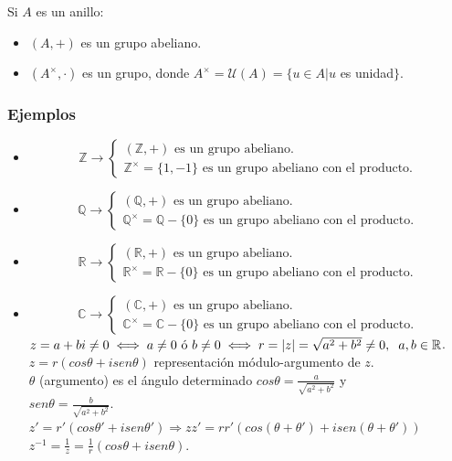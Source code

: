 \documentclass[11pt,a4paper]{article}
\begin{document}
Si $A$ es un anillo:
\begin{itemize}
\item $(A,+)$ es un grupo abeliano.
\item $(A^{\times},\cdot)$ es un grupo, donde $A^{\times} = \mathcal{U}(A) = \{u \in A | u$ es unidad$\}$.
\end{itemize}

\subsubsection*{Ejemplos}

\begin{itemize}
\item 
\begin{equation*}
\mathbb{Z} \to
\begin{cases}
(\mathbb{Z}, +) \text{ es un grupo abeliano.} \\
\mathbb{Z}^{\times} = \{1,-1\} \text{ es un grupo abeliano con el producto.}
\end{cases}
\end{equation*}
\item 
\begin{equation*}
\mathbb{Q} \to
\begin{cases}
(\mathbb{Q}, +) \text{ es un grupo abeliano.} \\
\mathbb{Q}^{\times} = \mathbb{Q}-\{0\} \text{ es un grupo abeliano con el producto.}
\end{cases}
\end{equation*}
\item 
\begin{equation*}
\mathbb{R} \to
\begin{cases}
(\mathbb{R}, +) \text{ es un grupo abeliano.} \\
\mathbb{R}^{\times} = \mathbb{R}-\{0\} \text{ es un grupo abeliano con el producto.}
\end{cases}
\end{equation*}
\item 
\begin{equation*}
\mathbb{C} \to
\begin{cases}
(\mathbb{C}, +) \text{ es un grupo abeliano.} \\
\mathbb{C}^{\times} = \mathbb{C}-\{0\} \text{ es un grupo abeliano con el producto.}
\end{cases}
\end{equation*}
$z = a + bi \neq 0 \iff a \neq 0 \text{ ó } b \neq 0 \iff r = |z| = \sqrt{a^{2} + b^{2}} \neq 0, \hspace{0.2cm} a,b \in \mathbb{R}$. \\
$z = r(cos\theta + isen\theta)$ representación módulo-argumento de $z$. \\
$\theta$ (argumento) es el ángulo determinado $cos \theta = \frac{a}{\sqrt{a^{2}+b^{2}}}$ y \\ $sen \theta = \frac{b}{\sqrt{a^{2}+b^{2}}}$. \\
$z' = r'(cos\theta' + isen\theta') \Rightarrow zz' = rr'(cos(\theta + \theta') + isen(\theta + \theta'))$ \\
$z^{-1} = \frac{1}{z} = \frac{1}{r}(cos\theta + isen\theta)$.
\end{itemize}
\end{document}
